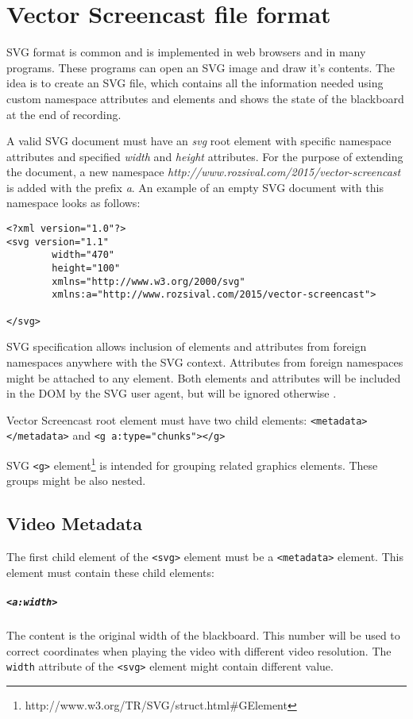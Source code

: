 \chapter{Vector Screencast file format}
\label{c:the-format}

SVG format is common and is implemented in web browsers and in many programs. These programs can open an SVG image and draw it's contents. The idea is to create an SVG file, which contains all the information needed using custom namespace attributes and elements and shows the state of the blackboard at the end of recording.

A valid SVG document must have an \textit{svg} root element with specific namespace attributes and specified \textit{width} and \textit{height} attributes. For the purpose of extending the document, a new namespace \textit{http://www.rozsival.com/2015/vector-screencast} is added with the prefix \textit{a}. An example of an empty SVG document with this namespace looks as follows:

\begin{lstlisting}
<?xml version="1.0"?>
<svg version="1.1"
        width="470"
        height="100"
        xmlns="http://www.w3.org/2000/svg"
        xmlns:a="http://www.rozsival.com/2015/vector-screencast">

</svg>
\end{lstlisting}

SVG specification allows inclusion of elements and attributes from foreign namespaces anywhere with the SVG context. Attributes from foreign namespaces might be attached to any element. Both elements and attributes will be included in the DOM by the SVG user agent, but will be ignored otherwise \cite{svg_exteding}.

Vector Screencast root element must have two child elements: \verb|<metadata></metadata>| and \verb|<g a:type="chunks"></g>|

SVG \verb|<g>| element\footnote{http://www.w3.org/TR/SVG/struct.html\#GElement} is intended for grouping related graphics elements. These groups might be also nested.

\section{Video Metadata}
The first child element of the \verb|<svg>| element must be a \verb|<metadata>| element. This element must contain these child elements:

\paragraph{\texttt{\textless a:width\textgreater}}
The content is the original width of the blackboard. This number will be used to correct coordinates when playing the video with different video resolution. The \verb|width| attribute of the \verb|<svg>| element might contain different value.

